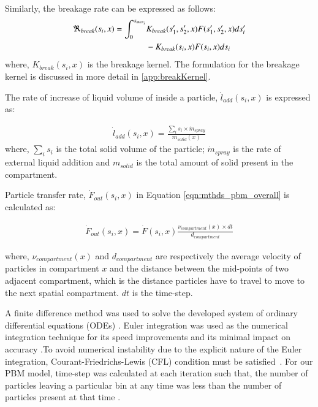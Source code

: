 \documentclass[review]{elsarticle}
\begin{document}
\begin{linenumbers}
Similarly, the breakage rate can be expressed as follows:
\begin{align}
\Re_{break}(s_i,x)  = \int_0^{s_{max_i}} & \notag
K_{break}(s_1',s_2',x)F(s_1',s_2',x)ds_i' \\ &  - K_{break}(s_i,x)F(s_i,x)ds_i
\label{eqn:mthds_pbm_breakage_geneq}
\end{align}   
where, $K_{break}(s_i,x)$ is the breakage kernel. The formulation for the breakage 
kernel is discussed in more detail in \ref{app:breakKernel}.

The rate of increase of liquid volume of inside a particle, 
$\dot{l}_{add}(s_i,x)$ is expressed as:

\begin{align}
\dot{l}_{add}(s_i,x) = \frac{\sum_is_i\times\dot{m}_{spray}}{m_{solid}(x)}
\label{eqn:mthds_liq_addn_rate}
\end{align}
where, $\sum_i s_i$  is the total solid volume of the particle; $\dot{m}_{spray}$ is the 
rate of external liquid addition and $m_{solid}$ is the total amount of solid present in the compartment.

Particle transfer rate, $\dot{F}_{out}(s_i,x)$ in Equation \ref{eqn:mthds_pbm_overall} 
is calculated as:

\begin{align}
\dot{F}_{out}(s_i,x) = \dot{F}(s_i,x)\frac{\nu_{compartment}(x)\times dt}{d_{compartment}}
\label{eqn:mthds_f_out_dot_part_trans_rate}
\end{align}

where, $\nu_{compartment}(x)$ and $d_{compartment}$ are respectively the average 
velocity of particles in compartment $x$ and the distance between the mid-points 
of two adjacent compartment, which is the distance particles have to travel to 
move to the next spatial compartment. $dt$ is the time-step.

A finite difference method was used to solve the developed system of ordinary differential 
equations (ODEs) \citep{Barrasso2015cerd}. 
Euler integration was used as the numerical integration technique for its speed 
improvements and its minimal impact on accuracy \citep{Barrasso2013}.To avoid numerical 
instability due to the explicit nature of the Euler integration, Courant-Friedrichs-Lewis 
(CFL) condition must be satisfied~\citep{courant1967}. For our PBM model, time-step was 
calculated at each iteration such that, the number of particles leaving a particular bin 
at any time was less than the number of particles present at that time \citep{Ramachandran2010}.


\end{linenumbers}
\end{document}
